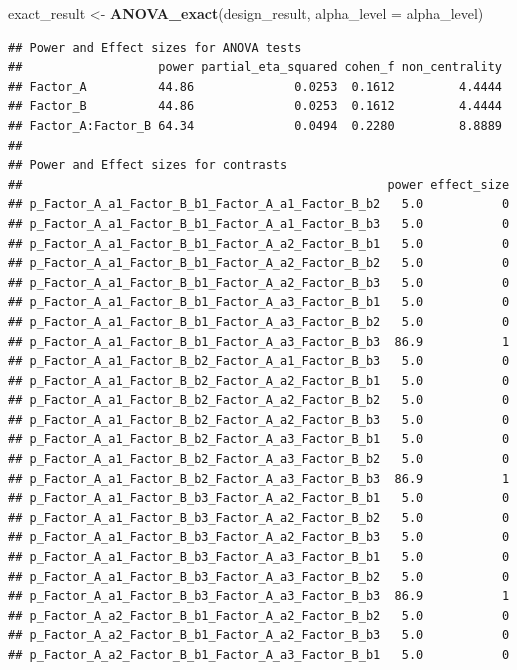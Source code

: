 \documentclass[]{book}
\newenvironment{Shaded}{\begin{snugshade}}{\end{snugshade}}
\newcommand{\DataTypeTok}[1]{\textcolor[rgb]{0.13,0.29,0.53}{#1}}
\newcommand{\KeywordTok}[1]{\textcolor[rgb]{0.13,0.29,0.53}{\textbf{#1}}}
\newcommand{\NormalTok}[1]{#1}
\newcommand{\StringTok}[1]{\textcolor[rgb]{0.31,0.60,0.02}{#1}}
\begin{document}
\begin{Shaded}
\begin{Highlighting}[]
\NormalTok{exact_result <-}\StringTok{ }\KeywordTok{ANOVA_exact}\NormalTok{(design_result, }\DataTypeTok{alpha_level =}\NormalTok{ alpha_level)}
\end{Highlighting}
\end{Shaded}

\begin{verbatim}
## Power and Effect sizes for ANOVA tests
##                   power partial_eta_squared cohen_f non_centrality
## Factor_A          44.86              0.0253  0.1612         4.4444
## Factor_B          44.86              0.0253  0.1612         4.4444
## Factor_A:Factor_B 64.34              0.0494  0.2280         8.8889
## 
## Power and Effect sizes for contrasts
##                                                   power effect_size
## p_Factor_A_a1_Factor_B_b1_Factor_A_a1_Factor_B_b2   5.0           0
## p_Factor_A_a1_Factor_B_b1_Factor_A_a1_Factor_B_b3   5.0           0
## p_Factor_A_a1_Factor_B_b1_Factor_A_a2_Factor_B_b1   5.0           0
## p_Factor_A_a1_Factor_B_b1_Factor_A_a2_Factor_B_b2   5.0           0
## p_Factor_A_a1_Factor_B_b1_Factor_A_a2_Factor_B_b3   5.0           0
## p_Factor_A_a1_Factor_B_b1_Factor_A_a3_Factor_B_b1   5.0           0
## p_Factor_A_a1_Factor_B_b1_Factor_A_a3_Factor_B_b2   5.0           0
## p_Factor_A_a1_Factor_B_b1_Factor_A_a3_Factor_B_b3  86.9           1
## p_Factor_A_a1_Factor_B_b2_Factor_A_a1_Factor_B_b3   5.0           0
## p_Factor_A_a1_Factor_B_b2_Factor_A_a2_Factor_B_b1   5.0           0
## p_Factor_A_a1_Factor_B_b2_Factor_A_a2_Factor_B_b2   5.0           0
## p_Factor_A_a1_Factor_B_b2_Factor_A_a2_Factor_B_b3   5.0           0
## p_Factor_A_a1_Factor_B_b2_Factor_A_a3_Factor_B_b1   5.0           0
## p_Factor_A_a1_Factor_B_b2_Factor_A_a3_Factor_B_b2   5.0           0
## p_Factor_A_a1_Factor_B_b2_Factor_A_a3_Factor_B_b3  86.9           1
## p_Factor_A_a1_Factor_B_b3_Factor_A_a2_Factor_B_b1   5.0           0
## p_Factor_A_a1_Factor_B_b3_Factor_A_a2_Factor_B_b2   5.0           0
## p_Factor_A_a1_Factor_B_b3_Factor_A_a2_Factor_B_b3   5.0           0
## p_Factor_A_a1_Factor_B_b3_Factor_A_a3_Factor_B_b1   5.0           0
## p_Factor_A_a1_Factor_B_b3_Factor_A_a3_Factor_B_b2   5.0           0
## p_Factor_A_a1_Factor_B_b3_Factor_A_a3_Factor_B_b3  86.9           1
## p_Factor_A_a2_Factor_B_b1_Factor_A_a2_Factor_B_b2   5.0           0
## p_Factor_A_a2_Factor_B_b1_Factor_A_a2_Factor_B_b3   5.0           0
## p_Factor_A_a2_Factor_B_b1_Factor_A_a3_Factor_B_b1   5.0           0

\end{verbatim}
\end{document}
